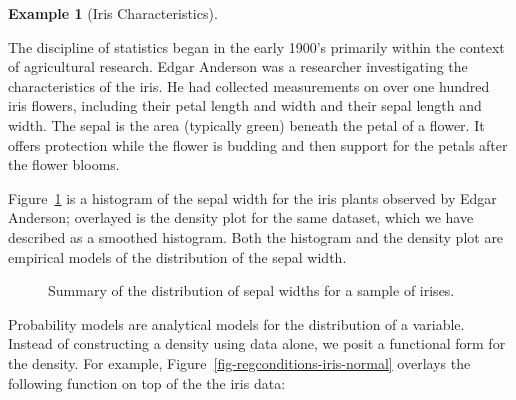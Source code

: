 \documentclass[
  letterpaper,
  DIV=11,
  numbers=noendperiod]{scrreprt}
\theoremstyle{plain}
\theoremstyle{definition}
\newtheorem{example}{Example}[chapter]
\theoremstyle{definition}
\theoremstyle{remark}
\begin{document}
\begin{example}[Iris
Characteristics]\protect\hypertarget{exm-iris}{}\label{exm-iris}

The discipline of statistics began in the early 1900's primarily within
the context of agricultural research. Edgar Anderson was a researcher
investigating the characteristics of the iris. He had collected
measurements on over one hundred iris flowers, including their petal
length and width and their sepal length and width. The sepal is the area
(typically green) beneath the petal of a flower. It offers protection
while the flower is budding and then support for the petals after the
flower blooms.

\end{example}

Figure~\ref{fig-regconditions-iris-histogram} is a histogram of the
sepal width for the iris plants observed by Edgar Anderson; overlayed is
the density plot for the same dataset, which we have described as a
smoothed histogram. Both the histogram and the density plot are
empirical models of the distribution of the sepal width.

\begin{figure}


\caption{\label{fig-regconditions-iris-histogram}Summary of the
distribution of sepal widths for a sample of irises.}

\end{figure}%

Probability models are analytical models for the distribution of a
variable. Instead of constructing a density using data alone, we posit a
functional form for the density. For example,
Figure~\ref{fig-regconditions-iris-normal} overlays the following
function on top of the the iris data:
\end{document}
